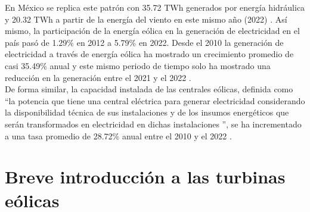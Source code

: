 \noindent En México se replica este patrón con 35.72 TWh generados por energía hidráulica y 
20.32 TWh a partir de la energía del viento en este mismo año (2022) \cite{owid-renewable-energy}. 
Así mismo, la participación de la energía eólica en la generación de electricidad en el país 
pasó de 1.29\% en 2012 a 5.79\% en 2022. Desde el 2010 la generación de electricidad a través 
de energía eólica ha mostrado un crecimiento promedio de casi 35.49\% anual y este mismo 
periodo de tiempo solo ha mostrado una reducción en la generación entre el 2021 y el 2022 \cite{statistical-review}.
\\

\noindent De forma similar, la capacidad instalada de las centrales eólicas, definida como 
“la potencia que tiene una central eléctrica para generar electricidad considerando la 
disponibilidad técnica de sus instalaciones y de los insumos energéticos que serán transformados 
en electricidad en dichas instalaciones \cite{CONACYT2022}”, se ha incrementado a una tasa 
promedio de 28.72\% anual entre el 2010 y el 2022 \cite{statistical-review}.

\section{Breve introducción a las turbinas eólicas}

